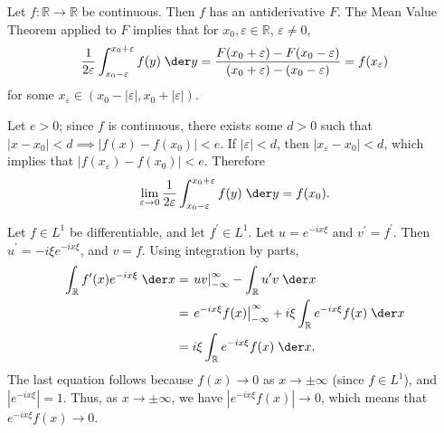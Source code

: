 \documentclass{homework}
\begin{document}
	\maketitle
	
	\question Let \(f: \mathbb{R} \to \mathbb{R}\) be continuous. Then \(f\) has an antiderivative \(F\). The Mean Value Theorem applied to \(F\) implies that for \(x_0, \varepsilon \in \mathbb{R}\), \(\varepsilon \ne 0\),
	\begin{equation*}
		\frac{1}{2\varepsilon}\int_{x_0-\varepsilon}^{x_0+\varepsilon}f(y)\;\der y = \frac{F(x_0 + \varepsilon) - F(x_0 - \varepsilon)}{(x_0 + \varepsilon) - (x_0 - \varepsilon)} = f(x_\varepsilon)
	\end{equation*}
	for some \(x_\varepsilon \in (x_0 - |\varepsilon|, x_0 + |\varepsilon|)\). 
	
	Let \(e>0\); since \(f\) is continuous, there exists some \(d>0\) such that \(|x - x_0| < d \implies |f(x) - f(x_0)| < e\).
	If \(|\varepsilon| < d\), then \(|x_\varepsilon - x_0| < d\), which implies that \(|f(x_\varepsilon) - f(x_0)| < e\). Therefore
	\begin{equation*}
		\lim_{\varepsilon \to 0} \frac{1}{2\varepsilon}\int_{x_0-\varepsilon}^{x_0+\varepsilon}f(y)\;\der y = f(x_0).
	\end{equation*}

	\question Let \(f \in L^1\) be differentiable, and let \(f^\prime \in L^1\). Let \(u = e^{-ix\xi}\) and \(v^\prime = f^\prime\). Then \(u^\prime = -i\xi e^{-ix\xi}\), and \(v = f\). Using integration by parts,
	\begin{align*}
		\int_{\mathbb{R}}f^\prime(x)e^{-ix\xi}\;\der x &= \left.uv\right|_{-\infty}^{\infty} - \int_{\mathbb{R}} u^\prime v\;\der x \\
		&= \left.e^{-ix\xi}f(x)\right|_{-\infty}^{\infty} + i\xi\int_{\mathbb{R}}e^{-ix\xi}f(x)\;\der x\\
		&= i\xi\int_{\mathbb{R}}e^{-ix\xi}f(x)\;\der x.
	\end{align*}
	The last equation follows because \(f(x) \to 0\) as \(x \to \pm \infty\) (since \(f \in L^1\)), and \(\left|e^{-ix\xi}\right| = 1\). Thus, as \(x \to \pm\infty\), we have \(\left|e^{-ix\xi}f(x)\right|\to 0\), which means that \(e^{-ix\xi}f(x) \to 0\).
	
\end{document}
